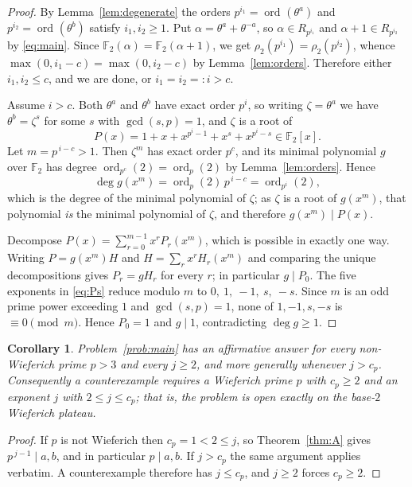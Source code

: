 \documentclass[a4paper]{article}
\newtheorem{corollary}[theorem]{Corollary}
\newcommand{\F}{\mathbb{F}}
\newcommand{\ord}[2][]{\operatorname{ord}_{#1}\!\left(#2\right)}
\begin{document}
\begin{proof}
	By Lemma~\ref{lem:degenerate} the orders $p^{i_1}=\ord{\theta^a}$ and
	$p^{i_2}=\ord{\theta^b}$ satisfy $i_1,i_2\geq1$.
	Put $\alpha=\theta^{a}+\theta^{-a}$, so $\alpha\in R_{p^{i_1}}$ and
	$\alpha+1\in R_{p^{i_2}}$ by \eqref{eq:main}.
	Since $\F_2(\alpha)=\F_2(\alpha+1)$, we get
	$\rho_2(p^{i_1})=\rho_2(p^{i_2})$, whence
	$\max(0,i_1-c)=\max(0,i_2-c)$ by Lemma~\ref{lem:orders}.
	Therefore either $i_1,i_2\leq c$, and we are done, or $i_1=i_2=:i>c$.

	Assume $i>c$.
	Both $\theta^{a}$ and $\theta^{b}$ have exact order $p^{i}$, so writing
	$\zeta=\theta^{a}$ we have $\theta^{b}=\zeta^{s}$ for some $s$ with
	$\gcd(s,p)=1$, and $\zeta$ is a root of
	\begin{equation}\label{eq:Ps}
		P(x)=1+x+x^{p^{i}-1}+x^{s}+x^{p^{i}-s}\in\F_2[x].
	\end{equation}
	Let $m=p^{\,i-c}>1$.
	Then $\zeta^{m}$ has exact order $p^{c}$, and its minimal polynomial
	$g$ over $\F_2$ has degree $\ord[p^{c}]{2}=\ord[p]{2}$ by
	Lemma~\ref{lem:orders}.
	Hence
	\[
		\deg g(x^{m})=\ord[p]{2}\,p^{\,i-c}=\ord[p^{i}]{2},
	\]
	which is the degree of the minimal polynomial of $\zeta$; as $\zeta$ is
	a root of $g(x^m)$, that polynomial \emph{is} the minimal polynomial of
	$\zeta$, and therefore $g(x^{m})\mid P(x)$.

	Decompose $P(x)=\sum_{r=0}^{m-1}x^{r}P_r(x^{m})$, which is possible in
	exactly one way.
	Writing $P=g(x^{m})H$ and $H=\sum_r x^{r}H_r(x^{m})$ and comparing the
	unique decompositions gives $P_r=gH_r$ for every $r$; in particular
	$g\mid P_0$.
	The five exponents in \eqref{eq:Ps} reduce modulo $m$ to
	$0,\ 1,\ -1,\ s,\ -s$.
	Since $m$ is an odd prime power exceeding $1$ and $\gcd(s,p)=1$, none
	of $1,-1,s,-s$ is $\equiv0\pmod m$.
	Hence $P_0=1$ and $g\mid1$, contradicting $\deg g\geq1$.
\end{proof}

\begin{corollary}\label{cor:nonwieferich}
	Problem~\ref{prob:main} has an affirmative answer for every
	non-Wieferich prime $p>3$ and every $j\geq2$, and more generally
	whenever $j>c_p$.
	Consequently a counterexample requires a Wieferich prime $p$ with
	$c_p\geq2$ and an exponent $j$ with $2\leq j\leq c_p$; that is, the
	problem is open \emph{exactly on the base-$2$ Wieferich plateau}.
\end{corollary}

\begin{proof}
	If $p$ is not Wieferich then $c_p=1<2\leq j$, so
	Theorem~\ref{thm:A} gives $p^{\,j-1}\mid a,b$, and in particular
	$p\mid a,b$.
	If $j>c_p$ the same argument applies verbatim.
	A counterexample therefore has $j\leq c_p$, and $j\geq2$ forces
	$c_p\geq2$.
\end{proof}
\end{document}

